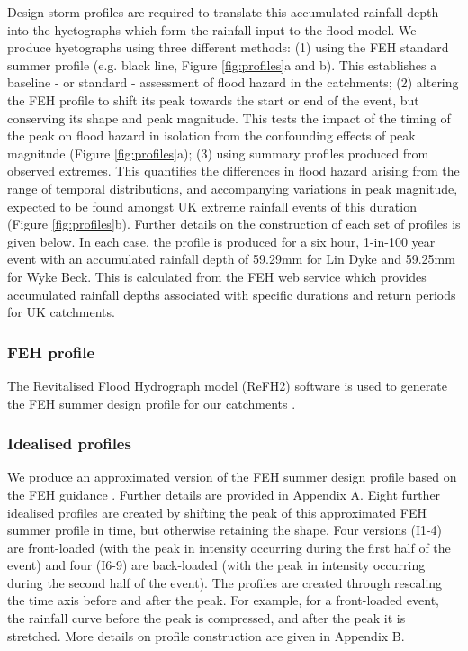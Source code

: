 \documentclass[APA,Times2COL]{WileyNJDv5}
\begin{document}
Design storm profiles are required to translate this accumulated rainfall depth into the hyetographs which form the rainfall input to the flood model. We produce hyetographs using three different methods: (1) using the FEH standard summer profile (e.g. black line, Figure \ref{fig:profiles}a and b). This establishes a baseline - or standard - assessment of flood hazard in the catchments; (2) altering the FEH profile to shift its peak towards the start or end of the event, but conserving its shape and peak magnitude. This tests the impact of the timing of the peak on flood hazard in isolation from the confounding effects of peak magnitude (Figure \ref{fig:profiles}a); (3) using summary profiles produced from observed extremes. This quantifies the differences in flood hazard arising from the range of temporal distributions, and accompanying variations in peak magnitude, expected to be found amongst UK extreme rainfall events of this duration (Figure \ref{fig:profiles}b). Further details on the construction of each set of profiles is given below. In each case, the profile is produced for a six hour, 1-in-100 year event with an accumulated rainfall depth of 59.29mm for Lin Dyke and 59.25mm for Wyke Beck. This is calculated from the FEH web service which provides accumulated rainfall depths associated with specific durations and return periods for UK catchments.

\subsubsection{FEH profile}\label{subsubsec:feh}
The Revitalised Flood Hydrograph model (ReFH2) software is used to generate the FEH summer design profile for our catchments \citep{kjeldsen2013modelling}.

\subsubsection{Idealised profiles}\label{subsubsec:idealised}
We produce an approximated version of the FEH summer design profile based on the FEH guidance \citep{kjeldsen2007revitalised}. Further details are provided in Appendix A. Eight further idealised profiles are created by shifting the peak of this approximated FEH summer profile in time, but otherwise retaining the shape. Four versions (I1-4) are front-loaded (with the peak in intensity occurring during the first half of the event) and four (I6-9) are back-loaded (with the peak in intensity occurring during the second half of the event). The profiles are created through rescaling the time axis before and after the peak. For example, for a front-loaded event, the rainfall curve before the peak is compressed, and after the peak it is stretched. More details on profile construction are given in Appendix B.
\end{document}
